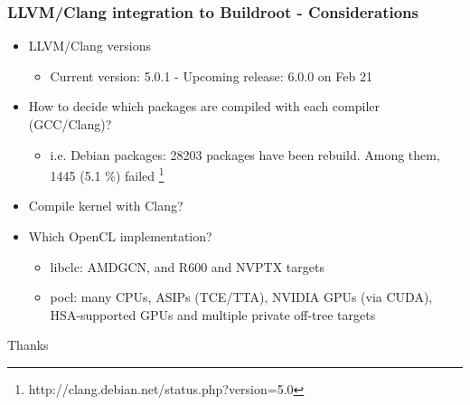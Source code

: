\documentclass{beamer}
\begin{document}
\begin{frame}
\frametitle{LLVM/Clang integration to Buildroot - Considerations}
\begin{itemize}
  \item LLVM/Clang versions
  \begin{itemize}
    \item Current version: 5.0.1 - Upcoming release: 6.0.0 on Feb 21
  \end{itemize}
  \item How to decide which packages are compiled with each compiler (GCC/Clang)?
  \begin{itemize}
    \item i.e. Debian packages: 28203 packages have been rebuild. Among them, 1445 (5.1 \%) failed \footnote{http://clang.debian.net/status.php?version=5.0}
  \end{itemize}
  \item Compile kernel with Clang?
  \item Which OpenCL implementation?
  \begin{itemize}
    \item {\selectfont libclc}: AMDGCN, and R600 and NVPTX targets
    \item {\selectfont pocl}: many CPUs, ASIPs (TCE/TTA), NVIDIA GPUs (via CUDA), HSA-supported GPUs and multiple private off-tree targets
  \end{itemize}
\end{itemize}
\end{frame}
\begin{frame}
\Huge{\centerline{Thanks}}
\end{frame}
\end{document}
